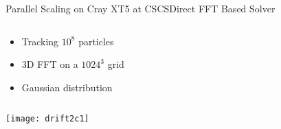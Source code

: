 \documentclass[xcolor=pdftex,table,10pt,yellow,mathserif]{beamer}
\begin{document}
\begin{frame}{\opal Parallel Scaling on Cray XT5 at CSCS}{Direct FFT Based Solver}
 \vspace{-3mm}  
   \begin{columns}
    \begin{column}{11.0cm}
      \scriptsize
        \begin{itemize}
       \item Tracking $10^8$ particles 
        \item 3D FFT on a $1024^3$ grid
        \item Gaussian distribution
       \end{itemize}
    
        
    
    \end{column}
   
  \end{columns}
  \vspace{-5mm}
  \texttt{[image: drift2c1]}
\end{frame}






% 
\end{document}

